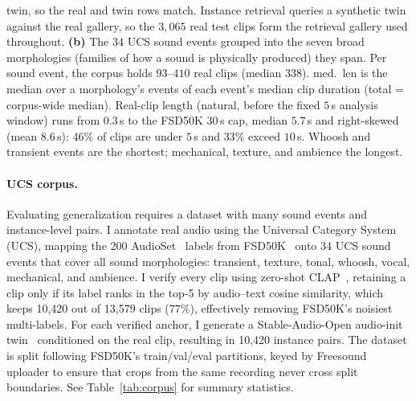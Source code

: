 \documentclass{article}
\begin{document}
\begin{table}
{twin, so the real and twin rows match. Instance retrieval queries a synthetic twin against the real
gallery, so the $3{,}065$ real test clips form the retrieval gallery used throughout. \textbf{(b)} The
34 UCS sound events grouped into the seven broad morphologies (families of how a sound is physically
produced) they span. Per sound event, the corpus holds $93$--$410$ real clips (median $338$). med.\ len is the median over a
morphology's events of each event's median clip duration (total = corpus-wide median).
Real-clip length (natural, before the fixed $5$\,s analysis window) runs from $0.3$\,s to the FSD50K
$30$\,s cap, median $5.7$\,s and right-skewed (mean $8.6$\,s): $46\%$ of clips are under $5$\,s and
$33\%$ exceed $10$\,s. Whoosh and transient events are the shortest; mechanical, texture, and
ambience the longest.}
\end{table}

\paragraph{UCS corpus.} Evaluating generalization requires a dataset with many sound events and instance-level pairs. I annotate real audio using the Universal Category System (UCS), mapping the 200 AudioSet~\citep{gemmeke2017audioset} labels from FSD50K~\citep{fonseca2022fsd50k} onto 34 UCS sound events that cover all sound morphologies: transient, texture, tonal, whoosh, vocal, mechanical, and ambience. I verify every clip using zero-shot CLAP~\citep{wu2023clap}, retaining a clip only if its label ranks in the top-5 by audio--text cosine similarity, which keeps 10{,}420 out of 13{,}579 clips ($77\%$), effectively removing FSD50K's noisiest multi-labels. For each verified anchor, I generate a Stable-Audio-Open audio-init twin~\citep{evans2024stableaudioopen} conditioned on the real clip, resulting in 10{,}420 instance pairs. The dataset is split following FSD50K's train/val/eval partitions, keyed by Freesound uploader to ensure that crops from the same recording never cross split boundaries. See Table~\ref{tab:corpus} for summary statistics.
\end{document}
